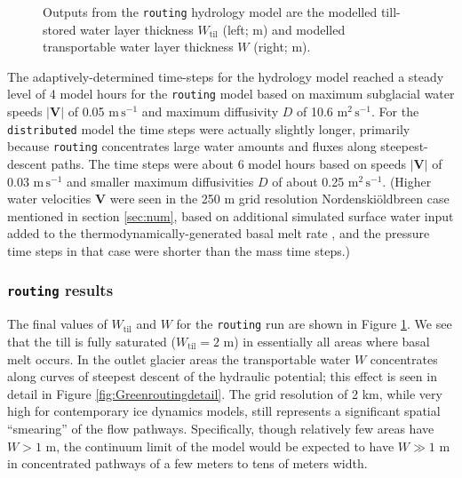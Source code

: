 \documentclass[gmd]{copernicus}   %
\newcommand{\text}{\textrm}
\newcommand\bV{\mathbf{V}}
\newcommand{\Wtil}{W_{\text{til}}}
\newcommand{\Nbreen}{Nordenski\"oldbreen\xspace}
\begin{document}
\begin{figure}[ht]
\caption{Outputs from the \texttt{routing} hydrology model are the modelled till-stored water layer thickness $\Wtil$ (left; $\mathrm{m}$) and modelled transportable water layer thickness $W$ (right; $\mathrm{m}$).}
\label{fig:Greenroutingresults}
\end{figure}

The adaptively-determined time-steps for the hydrology model reached a steady level of 4 model hours for the \texttt{routing} model based on maximum subglacial water speeds $|\bV|$ of 0.05 $\text{m}\,\text{s}^{-1}$ and maximum diffusivity $D$ of 10.6 $\text{m}^2\,\text{s}^{-1}$.  For the \texttt{distributed} model the time steps were actually slightly longer, primarily because \texttt{routing} concentrates large water amounts and fluxes along steepest-descent paths.  The time steps were about 6 model hours based on speeds $|\bV|$ of 0.03 $\text{m}\,\text{s}^{-1}$ and smaller maximum diffusivities $D$ of about 0.25 $\text{m}^2\,\text{s}^{-1}$.  (Higher water velocities $\bV$ were seen in the 250 m grid resolution \Nbreen case mentioned in section \ref{sec:num}, based on additional simulated surface water input added to the thermodynamically-generated basal melt rate \citep{vanPeltthesis}, and the pressure time steps in that case were shorter than the mass time steps.)

\subsubsection{\texttt{routing} results}  The final values of $\Wtil$ and $W$ for the \texttt{routing} run are shown in Figure \ref{fig:Greenroutingresults}.  We see that the till is fully saturated ($\Wtil=2$ m) in essentially all areas where basal melt occurs.  In the outlet glacier areas the transportable water $W$ concentrates along curves of steepest descent of the hydraulic potential; this effect is seen in detail in Figure \ref{fig:Greenroutingdetail}.  The grid resolution of 2 km, while very high for contemporary ice dynamics models, still represents a significant spatial ``smearing'' of the flow pathways.  Specifically, though relatively few areas have $W>1$ m, the continuum limit of the model would be expected to have $W\gg 1$ m in concentrated pathways of a few meters to tens of meters width.
\end{document}

